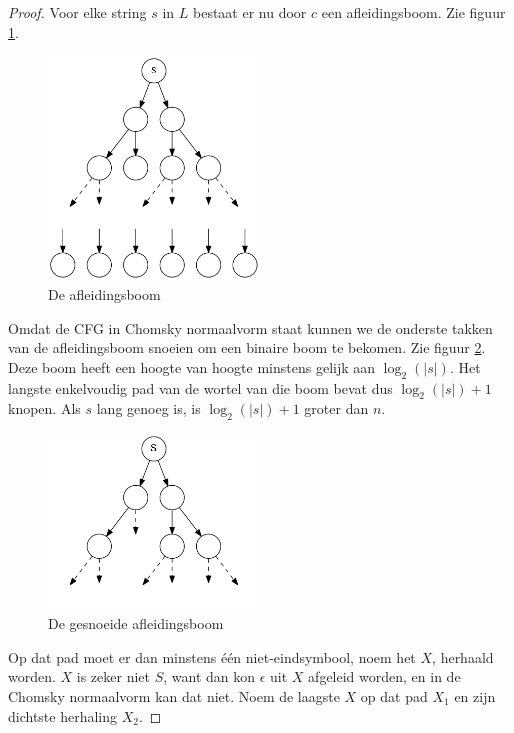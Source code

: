 \documentclass[main.tex]{subfiles}
\begin{document}
\begin{st}
\begin{proof}
    Voor elke string $s$ in $L$ bestaat er nu door $c$ een afleidingsboom. Zie figuur \ref{fig:afleidingsboom}.
    \begin{figure}[H]
      \centering
      \includegraphics[width=0.5\textwidth]{assets/pompend-lemma-parsetree.png}      
      \caption{De afleidingsboom}
      \label{fig:afleidingsboom}
    \end{figure}
    Omdat de CFG in Chomsky normaalvorm staat kunnen we de onderste takken van de afleidingsboom snoeien om een binaire boom te bekomen. Zie figuur \ref{fig:afleidingsboom-gesnoeid}.
    Deze boom heeft een hoogte van hoogte minstens gelijk aan $\log_{2}(|s|)$.
    Het langste enkelvoudig pad van de wortel van die boom bevat dus $\log_{2}(|s|)+1$ knopen.
    Als $s$ lang genoeg is, is $\log_{2}(|s|) + 1$ groter dan $n$.
    \begin{figure}[H]
      \centering
      \includegraphics[width=0.5\textwidth]{assets/pompend-lemma-parsetree-gesnoeid.png}      
      \caption{De gesnoeide afleidingsboom}
      \label{fig:afleidingsboom-gesnoeid}
    \end{figure}
    Op dat pad moet er dan minstens \'e\'en niet-eindsymbool, noem het $X$, herhaald worden.
    $X$ is zeker niet $S$, want dan kon $\epsilon$ uit $X$ afgeleid worden, en in de Chomsky normaalvorm kan dat niet.
    Noem de laagste $X$ op dat pad $X_{1}$ en zijn dichtste herhaling $X_{2}$. 

\end{proof}
\end{st}
\end{document}
